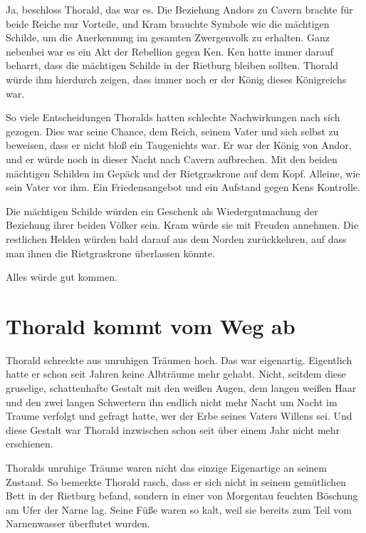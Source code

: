 \documentclass[10pt, a4paper, oneside]{book}
\begin{document}
Ja, beschloss Thorald, das war es. Die Beziehung Andors zu Cavern brachte für beide Reiche nur Vorteile, und Kram brauchte Symbole wie die mächtigen Schilde, um die Anerkennung im gesamten Zwergenvolk zu erhalten. Ganz nebenbei war es ein Akt der Rebellion gegen Ken. Ken hatte immer darauf beharrt, dass die mächtigen Schilde in der Rietburg bleiben sollten. Thorald würde ihm hierdurch zeigen, dass immer noch er der König dieses Königreichs war.

So viele Entscheidungen Thoralds hatten schlechte Nachwirkungen nach sich gezogen. Dies war seine Chance, dem Reich, seinem Vater und sich selbst zu beweisen, dass er nicht bloß ein Taugenichts war. Er war der König von Andor, und er würde noch in dieser Nacht nach Cavern aufbrechen. Mit den beiden mächtigen Schilden im Gepäck und der Rietgraskrone auf dem Kopf. Alleine, wie sein Vater vor ihm. Ein Friedensangebot und ein Aufstand gegen Kens Kontrolle.

Die mächtigen Schilde würden ein Geschenk als Wiedergutmachung der Beziehung ihrer beiden Völker sein. Kram würde sie mit Freuden annehmen. Die restlichen Helden würden bald darauf aus dem Norden zurückkehren, auf dass man ihnen die Rietgraskrone überlassen könnte.

Alles würde gut kommen.








\newpage
\section{Thorald kommt vom Weg ab}


Thorald schreckte aus unruhigen Träumen hoch. Das war eigenartig. Eigentlich hatte er schon seit Jahren keine Albträume mehr gehabt. Nicht, seitdem diese gruselige, schattenhafte Gestalt mit den weißen Augen, dem langen weißen Haar und den zwei langen Schwertern ihn endlich nicht mehr Nacht um Nacht im Traume verfolgt und gefragt hatte, wer der Erbe seines Vaters Willens sei. Und diese Gestalt war Thorald inzwischen schon seit über einem Jahr nicht mehr erschienen.

Thoralds unruhige Träume waren nicht das einzige Eigenartige an seinem Zustand. So bemerkte Thorald rasch, dass er sich nicht in seinem gemütlichen Bett in der Rietburg befand, sondern in einer von Morgentau feuchten Böschung am Ufer der Narne lag. Seine Füße waren so kalt, weil sie bereits zum Teil vom Narnenwasser überflutet wurden.
\end{document}

